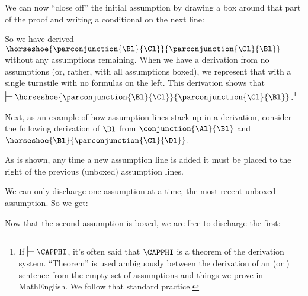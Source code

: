 We can now ``close off'' the initial assumption by drawing a box around that part of the proof and writing a conditional on the next line:
\begin{gproof}[\label{simpleconjunctionclosed}]
\end{gproof}
\noindent{}So we have derived $\horseshoe{\parconjunction{\Bl}{\Cl}}{\parconjunction{\Cl}{\Bl}}$ without any assumptions remaining.
When we have a derivation from no assumptions (or, rather, with all assumptions boxed), we represent that with a single turnstile with no formulas on the left.
This derivation shows that $\sststile{}{}\horseshoe{\parconjunction{\Bl}{\Cl}}{\parconjunction{\Cl}{\Bl}}$.\footnote{If $\sststile{}{}\CAPPHI$, it's often said that $\CAPPHI$ is a theorem of the derivation system.
``Theorem'' is used ambiguously between the derivation of an \GSL (or \GQL) sentence from the empty set of assumptions and things we prove in MathEnglish.
We follow that standard practice.}

Next, as an example of how assumption lines stack up in a derivation, consider the following derivation of $\Dl$ from $\conjunction{\Al}{\Bl}$ and $\horseshoe{\Bl}{\parconjunction{\Cl}{\Dl}}$.
\begin{gproof}[\label{secondexample}]
\end{gproof}
\noindent{}As is shown, any time a new assumption line is added it must be placed to the right of the previous (unboxed) assumption lines.

We can only discharge one assumption at a time, the most recent unboxed assumption.
So we get:

\begin{gproof}
\end{gproof}
\noindent{}Now that the second assumption is boxed, we are free to discharge the first:

